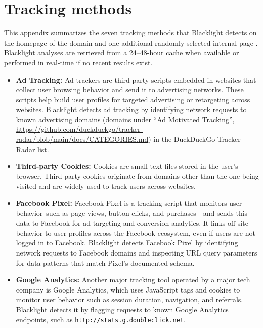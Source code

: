 \documentclass[12pt, letterpaper]{article}
\begin{document}
\clearpage
\FloatBarrier
\section{Tracking methods}\label{sm:bl_tracking_mechanisms}
This appendix summarizes the seven tracking methods that Blacklight detects on the homepage of the domain and one additional randomly selected internal page \citep{blacklight}. 
Blacklight analyses are retrieved from a 24--48-hour cache when available or performed in real-time if no recent results exist.

\begin{itemize}
    \item{
        \textbf{Ad Tracking:} 
        Ad trackers are third-party scripts embedded in websites that collect user browsing behavior and send it to advertising networks. These scripts help build user profiles for targeted advertising or retargeting across websites. Blacklight detects ad tracking by identifying network requests to known advertising domains (domains under ``Ad Motivated Tracking'', \url{https://github.com/duckduckgo/tracker-radar/blob/main/docs/CATEGORIES.md}) in the DuckDuckGo Tracker Radar list.
    }
    \item{
        \textbf{Third-party Cookies:} 
        Cookies are small text files stored in the user's browser.
        Third-party cookies originate from domains other than the one being visited and are widely used to track users across websites.
    }
    \item{
        \textbf{Facebook Pixel:} 
        Facebook Pixel is a tracking script that monitors user behavior--such as page views, button clicks, and purchases---and sends this data to Facebook for ad targeting and conversion analytics.
        It links off-site behavior to user profiles across the Facebook ecosystem, even if users are not logged in to Facebook.
        Blacklight detects Facebook Pixel by identifying network requests to Facebook domains and inspecting URL query parameters for data patterns that match Pixel's documented schema.    
    }
    \item{
        \textbf{Google Analytics:} 
        Another major tracking tool operated by a major tech company is Google Analytics, which uses JavaScript tags and cookies to monitor user behavior such as session duration, navigation, and referrals.
        Blacklight detects it by flagging requests to known Google Analytics endpoints, such as \texttt{http://stats.g.doubleclick.net}.
    }


\end{itemize}
\end{document}
